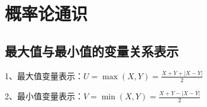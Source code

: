 \chapter{概率论通识}

\section{最大值与最小值的变量关系表示}

1、最大值变量表示：$ U=\max (X, Y)=\frac{X+Y+|X-Y|}{2} $



2、最小值变量表示：$ V=\min (X, Y)=\frac{X+Y-|X-Y|}{2} $

